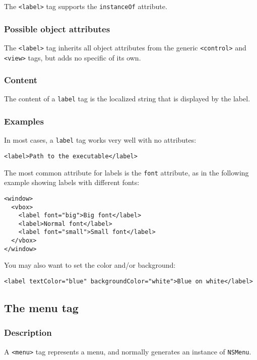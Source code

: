 The \texttt{<label>} tag supports the \texttt{instanceOf} attribute.

\subsubsection{Possible object attributes}
The \texttt{<label>} tag inherits all object attributes from the
generic \texttt{<control>} and \texttt{<view>} tags, but adds no
specific of its own.

\subsubsection{Content}
The content of a \texttt{label} tag is the localized string that is
displayed by the label.

\subsubsection{Examples}
In most cases, a \texttt{label} tag works very well with no attributes:
\begin{verbatim}
<label>Path to the executable</label>
\end{verbatim}

The most common attribute for labels is the \texttt{font} attribute,
as in the following example showing labels with different fonts:
\begin{verbatim}
<window>
  <vbox>
    <label font="big">Big font</label>
    <label>Normal font</label>
    <label font="small">Small font</label>
  </vbox>
</window>
\end{verbatim}

You may also want to set the color and/or background:
\begin{verbatim}
<label textColor="blue" backgroundColor="white">Blue on white</label>
\end{verbatim}

\subsection{The menu tag}

\subsubsection{Description}
A \texttt{<menu>} tag represents a menu, and normally generates an
instance of \texttt{NSMenu}.

